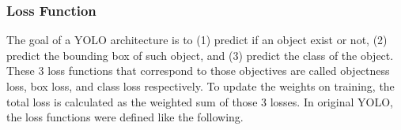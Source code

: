   

    \subsubsection{Loss Function}
    The goal of a YOLO architecture is to (1) predict if an object exist or not, (2) predict the bounding box of such object,
    and (3) predict the class of the object. These 3 loss functions that correspond to those objectives are called 
    objectness loss, box loss, and class loss respectively. To update the weights on training, the total loss is calculated as 
    the weighted sum of those 3 losses.
    In original YOLO, the loss functions were defined like the following.

